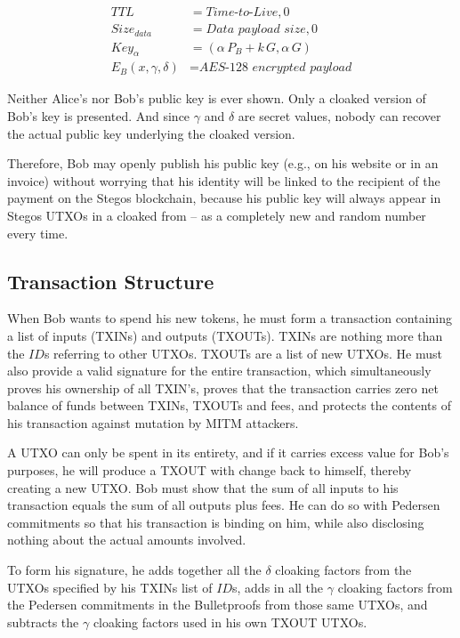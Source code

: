 \documentclass[a4paper, 10pt, conference]{ieeeconf}
\begin{document}
\begin{align*}
TTL &= \textit{Time-to-Live}, 0 \\
Size_{data} &= \textit{Data payload size}, 0 \\
Key_{\alpha} &= (\alpha \, P_{B} + k \, G, \alpha \, G ) \\
E_B(x, \gamma, \delta) &= \textit{AES-128 encrypted payload}
\end{align*}

Neither Alice's nor Bob's public key is ever shown. Only a cloaked version of Bob's key is presented. And since $\gamma$ and $\delta$ are secret values, nobody can recover the actual public key underlying the cloaked version. 

Therefore, Bob may openly publish his public key (e.g., on his website or in an invoice) without worrying that his identity will be linked to the recipient of the payment on the Stegos blockchain, because his public key will always appear in Stegos UTXOs in a cloaked from -- as a completely new and random number every time.

\subsection{Transaction Structure}

When Bob wants to spend his new tokens, he must form a transaction containing a list of inputs (TXINs) and outputs (TXOUTs). TXINs are nothing more than the $\mathit{ID}$s referring to other UTXOs. TXOUTs are a list of new UTXOs. He must also provide a valid signature for the entire transaction, which simultaneously proves his ownership of all TXIN's, proves that the transaction carries zero net balance of funds between TXINs, TXOUTs and fees, and protects the contents of his transaction against mutation by MITM attackers.

A UTXO can only be spent in its entirety, and if it carries excess value for Bob's purposes, he will produce a TXOUT with change back to himself, thereby creating a new UTXO. Bob must show that the sum of all inputs to his transaction equals the sum of all outputs plus fees. He can do so with Pedersen commitments so that his transaction is binding on him, while also disclosing nothing about the actual amounts involved.

To form his signature, he adds together all the $\delta$ cloaking factors from the UTXOs specified by his TXINs list of $\mathit{ID}$s, adds in all the $\gamma$ cloaking factors from the Pedersen commitments in the Bulletproofs from those same UTXOs, and subtracts the $\gamma$ cloaking factors used in his own TXOUT UTXOs. 
\end{document}
